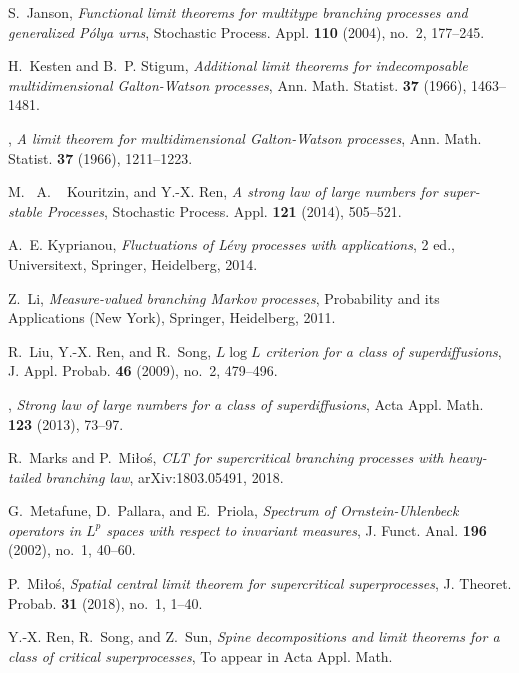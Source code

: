 \documentclass[12pt,a4paper]{amsart}
\theoremstyle{plain}
\theoremstyle{definition}
\numberwithin{equation}{section}
\begin{document}
\begin{thebibliography}{10}
S.~Janson, \emph{Functional limit theorems for multitype branching processes
  and generalized {P}\'{o}lya urns}, Stochastic Process. Appl. \textbf{110}
  (2004), no.~2, 177--245.

H.~Kesten and B.~P. Stigum, \emph{Additional limit theorems for indecomposable
  multidimensional {G}alton-{W}atson processes}, Ann. Math. Statist.
  \textbf{37} (1966), 1463--1481.

\bysame, \emph{A limit theorem for multidimensional {G}alton-{W}atson
  processes}, Ann. Math. Statist. \textbf{37} (1966), 1211--1223.

 M. ~A. ~ Kouritzin, and  Y.-X. Ren,  \emph{A strong law of large numbers for super-stable Processes},  Stochastic Process. Appl.  \textbf{121} (2014),  505--521.

A.~E. Kyprianou, \emph{Fluctuations of {L}\'{e}vy processes with applications},
  2 ed., Universitext, Springer, Heidelberg, 2014.

Z.~Li, \emph{Measure-valued branching {M}arkov processes}, Probability and its
  Applications (New York), Springer, Heidelberg, 2011.

R.~Liu, Y.-X. Ren, and R.~Song, \emph{{$L\log L$} criterion for a class of
  superdiffusions}, J. Appl. Probab. \textbf{46} (2009), no.~2, 479--496.

\bysame, \emph{Strong law of large numbers for a
  class of superdiffusions}, Acta Appl. Math. \textbf{123} (2013), 73--97.

R.~Marks and P.~Mi{\l}o{\'s}, \emph{C{LT} for supercritical branching processes
  with heavy-tailed branching law}, arXiv:1803.05491, 2018.

G.~Metafune, D.~Pallara, and E.~Priola, \emph{Spectrum of
  {O}rnstein-{U}hlenbeck operators in {$L^p$} spaces with respect to invariant
  measures}, J. Funct. Anal. \textbf{196} (2002), no.~1, 40--60.

P.~Mi{\l}o{\'s},
\emph{Spatial central limit theorem for supercritical superprocesses},
 J. Theoret. Probab. \textbf{31} (2018), no.~1, 1--40.

Y.-X. Ren, R.~Song, and Z.~Sun, \emph{Spine decompositions and limit theorems
  for a class of critical superprocesses},
  To appear in Acta Appl. Math.


\end{thebibliography}
\end{document}
